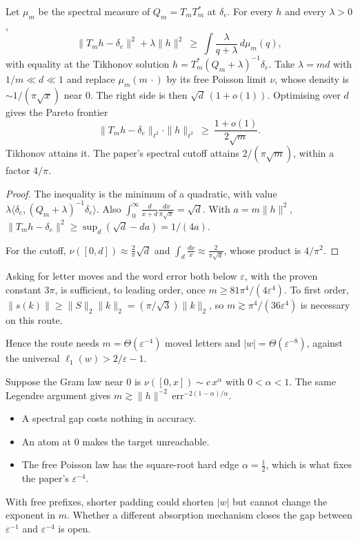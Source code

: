 \begin{proposition}
Let $\mu_m$ be the spectral measure of $Q_m=T_mT_m^*$ at $\delta_e$. For every $h$ and every $\lambda>0$,
\[
\|T_mh-\delta_e\|^2+\lambda\|h\|^2\ \ge\ \int\frac{\lambda}{q+\lambda}\,d\mu_m(q),
\]
with equality at the Tikhonov solution $h=T_m^*(Q_m+\lambda)^{-1}\delta_e$. Take $\lambda=md$ with $1/m\ll d\ll1$ and replace $\mu_m(m\,\cdot)$ by its free Poisson limit
$\nu$, whose density is $\sim1/(\pi\sqrt x)$ near $0$. The right side is then $\sqrt d\,(1+o(1))$. Optimising over $d$ gives the Pareto frontier
\[
\|T_mh-\delta_e\|_{\ell^2}\cdot\|h\|_{\ell^2}\ \ge\ \frac{1+o(1)}{2\sqrt m}.
\]
Tikhonov attains it. The paper's spectral cutoff attains $2/(\pi\sqrt m)$, within a factor $4/\pi$.
\end{proposition}
\begin{proof}
The inequality is the minimum of a quadratic, with value $\lambda\langle\delta_e,(Q_m+\lambda)^{-1}\delta_e\rangle$. Also
$\int_0^\infty\frac{d}{x+d}\frac{dx}{\pi\sqrt x}=\sqrt d$. With $a=m\|h\|^2$, $\|T_mh-\delta_e\|^2\ge\sup_d(\sqrt d-da)=1/(4a)$.

For the cutoff, $\nu([0,d])\approx\frac2\pi\sqrt d$ and $\int_d\frac{d\nu}x\approx\frac2{\pi\sqrt d}$, whose product is $4/\pi^2$.
\end{proof}
\begin{corollary}
Asking for letter moves and the word error both below $\varepsilon$, with the proven constant $3\pi$, is sufficient, to leading order, once
$m\ge81\pi^4/(4\varepsilon^4)$. To first order, $\|s(k)\|\ge\|S\|_2\|k\|_2=(\pi/\sqrt3)\|k\|_2$, so $m\gtrsim\pi^4/(36\varepsilon^4)$ is necessary on this route.

Hence the route needs $m=\Theta(\varepsilon^{-4})$ moved letters and $|w|=\Theta(\varepsilon^{-8})$, against the universal $\ell_1(w)>2/\varepsilon-1$.
\end{corollary}
\begin{remark}
Suppose the Gram law near $0$ is $\nu([0,x])\sim c\,x^\alpha$ with $0<\alpha<1$. The same Legendre argument gives
$m\gtrsim\|h\|^{-2}\,\mathrm{err}^{-2(1-\alpha)/\alpha}$.
\begin{itemize}[leftmargin=*]
\item A spectral gap costs nothing in accuracy.
\item An atom at $0$ makes the target unreachable.
\item The free Poisson law has the square-root hard edge $\alpha=\frac12$, which is what fixes the paper's $\varepsilon^{-4}$.
\end{itemize}
With free prefixes, shorter padding could shorten $|w|$ but cannot change the exponent in $m$. Whether a different absorption mechanism closes the gap between $\varepsilon^{-1}$ and $\varepsilon^{-4}$ is open.
\end{remark}

